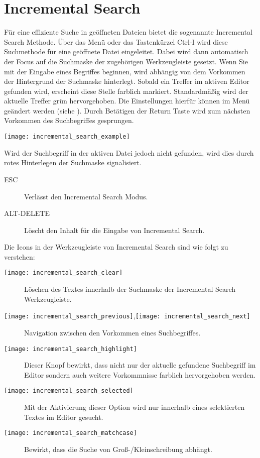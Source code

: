 \section{Incremental Search}

Für eine effiziente Suche in geöffneten Dateien bietet \codeblocks die sogenannte Incremental Search Methode. Über das Menü  oder das Tastenkürzel Ctrl-I wird diese Suchmethode für eine geöffnete Datei eingeleitet. Dabei wird dann automatisch der Focus auf die Suchmaske der zugehörigen Werkzeugleiste gesetzt. Wenn Sie mit der Eingabe eines Begriffes beginnen, wird abhängig von dem Vorkommen der Hintergrund der Suchmaske hinterlegt. Sobald ein Treffer im aktiven Editor gefunden wird, erscheint diese Stelle farblich markiert. Standardmäßig wird der aktuelle Treffer grün hervorgehoben. Die Einstellungen hierfür können im Menü  geändert werden (siehe ). Durch Betätigen der Return Taste wird zum nächsten Vorkommen des Suchbegriffes gesprungen.

\texttt{[image: incremental\_search\_example]}

Wird der Suchbegriff in der aktiven Datei jedoch nicht gefunden, wird dies durch rotes Hinterlegen der Suchmaske signalisiert.

\begin{description}
\item[ESC] Verlässt den Incremental Search Modus.
\item[ALT-DELETE] Löscht den Inhalt für die Eingabe von Incremental Search.
\end{description}

Die Icons in der Werkzeugleiste von Incremental Search sind wie folgt zu verstehen:

\begin{description}
\item[\texttt{[image: incremental\_search\_clear]}] Löschen des Textes innerhalb der Suchmaske der Incremental Search Werkzeugleiste.
\item[\texttt{[image: incremental\_search\_previous]},\texttt{[image: incremental\_search\_next]}] Navigation zwischen den Vorkommen eines Suchbegriffes.
\item[\texttt{[image: incremental\_search\_highlight]}] Dieser Knopf bewirkt, dass nicht nur der aktuelle gefundene Suchbegriff im Editor sondern auch weitere Vorkommnisse farblich hervorgehoben werden.
\item[\texttt{[image: incremental\_search\_selected]}] Mit der Aktivierung dieser Option wird nur innerhalb eines selektierten Textes im Editor gesucht.
\item[\texttt{[image: incremental\_search\_matchcase]}] Bewirkt, dass die Suche von Groß-/Kleinschreibung abhängt.
\end{description}


